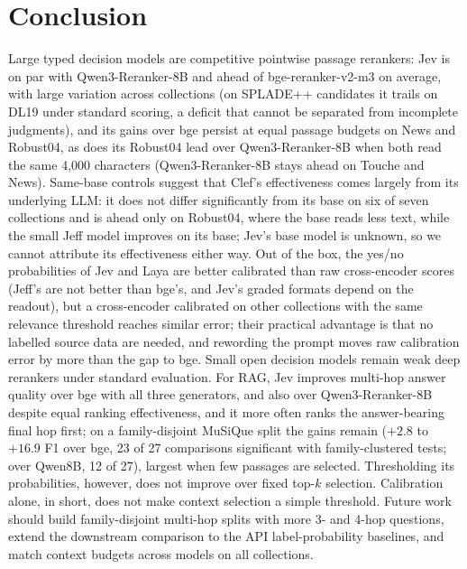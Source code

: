 \section{Conclusion}

Large typed decision models are competitive pointwise passage rerankers: Jev is on par with Qwen3-Reranker-8B and ahead of bge-reranker-v2-m3 on average, with large variation across collections (on SPLADE++ candidates it trails on DL19 under standard scoring, a deficit that cannot be separated from incomplete judgments), and its gains over bge persist at equal passage budgets on News and Robust04, as does its Robust04 lead over Qwen3-Reranker-8B when both read the same 4{,}000 characters (Qwen3-Reranker-8B stays ahead on Touche and News). Same-base controls suggest that Clef's effectiveness comes largely from its underlying LLM: it does not differ significantly from its base on six of seven collections and is ahead only on Robust04, where the base reads less text, while the small Jeff model improves on its base; Jev's base model is unknown, so we cannot attribute its effectiveness either way.
Out of the box, the yes/no probabilities of Jev and Laya are better calibrated than raw cross-encoder scores (Jeff's are not better than bge's, and Jev's graded formats depend on the readout), but a cross-encoder calibrated on other collections with the same relevance threshold reaches similar error; their practical advantage is that no labelled source data are needed, and rewording the prompt moves raw calibration error by more than the gap to bge. Small open decision models remain weak deep rerankers under standard evaluation.
For RAG, Jev improves multi-hop answer quality over bge with all three generators, and also over Qwen3-Reranker-8B despite equal ranking effectiveness, and it more often ranks the answer-bearing final hop first; on a family-disjoint MuSiQue split the gains remain ($+2.8$ to $+16.9$ F1 over bge, 23 of 27 comparisons significant with family-clustered tests; over Qwen8B, 12 of 27), largest when few passages are selected. Thresholding its probabilities, however, does not improve over fixed top-$k$ selection. Calibration alone, in short, does not make context selection a simple threshold.
Future work should build family-disjoint multi-hop splits with more 3- and 4-hop questions, extend the downstream comparison to the API label-probability baselines, and match context budgets across models on all collections.
